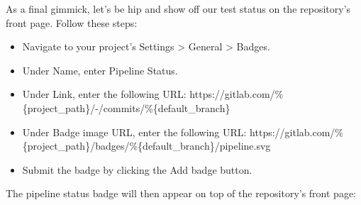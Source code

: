 \documentclass[11pt]{article}
\makeatletter
\providecommand{\tightlist}{%
      \setlength{\itemsep}{0pt}\setlength{\parskip}{0pt}}
\newcommand{\boxspacing}{\kern\kvtcb@left@rule\kern\kvtcb@boxsep}
\newcommand{\prompt}[4]{
        \ttfamily\llap{{\color{#2}[#3]:\hspace{3pt}#4}}\vspace{-\baselineskip}
    }
\makeatother
\begin{document}
    As a final gimmick, let's be hip and show off our test status on the
repository's front page. Follow these steps:

\begin{itemize}
\tightlist
\item
  Navigate to your project's Settings \textgreater{} General
  \textgreater{} Badges.
\item
  Under Name, enter Pipeline Status.
\item
  Under Link, enter the following URL:
  https://gitlab.com/\%\{project\_path\}/-/commits/\%\{default\_branch\}
\item
  Under Badge image URL, enter the following URL:
  https://gitlab.com/\%\{project\_path\}/badges/\%\{default\_branch\}/pipeline.svg
\item
  Submit the badge by clicking the Add badge button.
\end{itemize}

The pipeline status badge will then appear on top of the repository's
front page:

    \begin{tcolorbox}[breakable, size=fbox, boxrule=1pt, pad at break*=1mm,colback=cellbackground, colframe=cellborder]
\prompt{In}{incolor}{ }{\boxspacing}
\begin{Verbatim}[commandchars=\\\{\}]

\end{Verbatim}
\end{tcolorbox}


    
    
    
\end{document}
